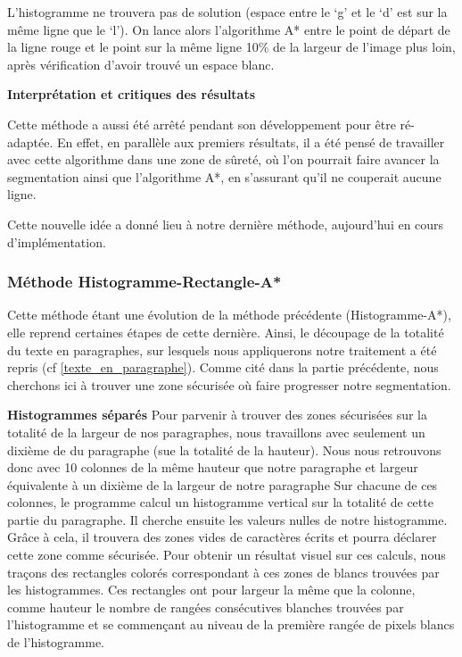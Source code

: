 \documentclass[12pt,a4paper]{article}
\begin{document}
L’histogramme ne trouvera pas de solution (espace entre le ‘g’ et le ‘d’ est sur la même ligne que le ‘l’). On lance alors l’algorithme A* entre le point de départ de la ligne rouge et le point sur la même ligne 10\% de la largeur de l’image plus loin, après vérification d’avoir trouvé un espace blanc.

\bigbreak\textbf{Interprétation et critiques des résultats}\bigbreak

Cette méthode a aussi été arrêté pendant son développement pour être ré-adaptée. En effet, en parallèle aux premiers résultats,  il a été pensé de travailler avec cette algorithme dans une zone de sûreté, où l'on pourrait faire avancer la segmentation ainsi que l'algorithme A*, en s'assurant qu'il ne couperait aucune ligne.

Cette nouvelle idée a donné lieu à notre dernière méthode, aujourd'hui en cours d'implémentation.

\newpage
\subsubsection{Méthode Histogramme-Rectangle-A*}
Cette méthode étant une évolution de la méthode précédente (Histogramme-A*), elle reprend certaines étapes de cette dernière.\bigbreak
Ainsi, le découpage de la totalité du texte en paragraphes, sur lesquels nous appliquerons notre traitement a été repris (cf \ref{texte_en_paragraphe}).\bigbreak
Comme cité dans la partie précédente, nous cherchons ici à trouver une zone sécurisée où faire progresser notre segmentation.\bigbreak

\bigbreak\textbf{Histogrammes séparés}\bigbreak
Pour parvenir à trouver des zones sécurisées sur la totalité de la largeur de nos paragraphes, nous travaillons avec seulement un dixième de du paragraphe (sue la totalité de la hauteur). Nous nous retrouvons donc avec 10 colonnes de la même hauteur que notre paragraphe et largeur équivalente à un dixième de la largeur de notre paragraphe\bigbreak
Sur chacune de ces colonnes, le programme calcul un histogramme vertical sur la totalité de cette partie du paragraphe. Il cherche ensuite les valeurs nulles de notre histogramme. Grâce à cela, il trouvera des zones vides de caractères écrits et pourra déclarer cette zone comme sécurisée.\bigbreak
Pour obtenir un résultat visuel sur ces calculs, nous traçons des rectangles colorés correspondant à ces zones de blancs trouvées par les histogrammes. Ces rectangles ont pour largeur la même que la colonne, comme hauteur le nombre de rangées consécutives blanches trouvées par l'histogramme et se commençant au niveau de la première rangée de pixels blancs de l'histogramme.\bigbreak
\end{document}
